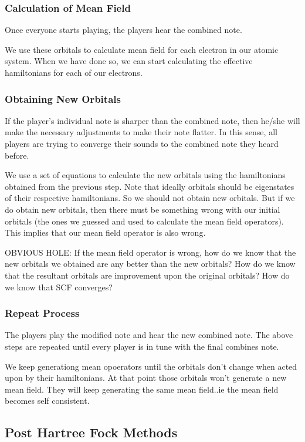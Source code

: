 \documentclass{article}
\begin{document}
\subsubsection{Calculation of Mean Field}
Once everyone starts playing, the players hear the combined note.

We use these orbitals to calculate mean field for each electron in our atomic
system. When we have done so, we can start calculating the effective hamiltonians
for each of our electrons.
\subsubsection{Obtaining New Orbitals}
If the player's individual note is sharper than the combined note, then he/she
will make the necessary adjustments to make their note flatter. In this sense,
all players are trying to converge their sounds to the combined note they heard
before.

We use a set of equations to calculate the new orbitals using the hamiltonians
obtained from the previous step. Note that ideally orbitals should be
eigenstates of their respective hamiltonians. So we should not obtain new
orbitals. But if we do obtain new orbitals, then there must be something wrong
with our initial orbitals (the ones we guessed and used to calculate the mean
field operators). This implies that our mean field operator is also wrong.

OBVIOUS HOLE: If the mean field operator is wrong, how do we know that the
new orbitals we obtained are any better than the new orbitals? How do
we know that the resultant orbitals are improvement upon the original
orbitals? How do we know that SCF converges?

\subsubsection{Repeat Process}
The players play the modified note and hear the new combined note. The above
steps are repeated until every player is in tune with the final combines note.

We keep generationg mean opoerators until the orbitals don't change when acted
upon by their hamiltonians. At that point those orbitals won't generate a new
mean field. They will keep generating the same mean field..ie the mean field
becomes self consistent.


\subsection{Post Hartree Fock Methods}
\end{document}
